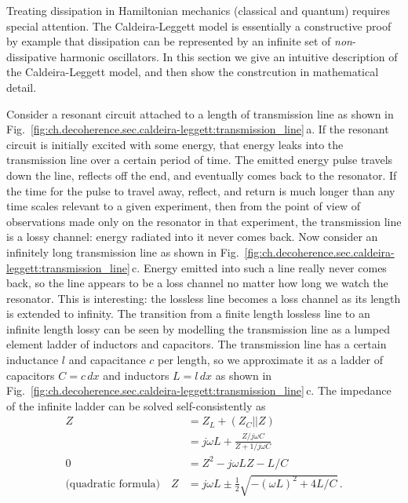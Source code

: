  \label{sec:ch.decoherence:caldeira-leggett}


Treating dissipation in Hamiltonian mechanics (classical and quantum) requires special attention.
The Caldeira-Leggett model is essentially a constructive proof by example that dissipation can be represented by an infinite set of \emph{non}-dissipative harmonic oscillators.
In this section we give an intuitive description of the Caldeira-Leggett model, and then show the constrcution in mathematical detail.


Consider a resonant circuit attached to a length of transmission line as shown in Fig.~\ref{fig:ch.decoherence.sec.caldeira-leggett:transmission_line}\,a.
If the resonant circuit is initially excited with some energy, that energy leaks into the transmission line over a certain period of time.
The emitted energy pulse travels down the line, reflects off the end, and eventually comes back to the resonator.
If the time for the pulse to travel away, reflect, and return is much longer than any time scales relevant to a given experiment, then from the point of view of observations made only on the resonator in that experiment, the transmission line is a lossy channel: energy radiated into it never comes back.
Now consider an infinitely long transmission line as shown in Fig.~\ref{fig:ch.decoherence.sec.caldeira-leggett:transmission_line}\,c.
Energy emitted into such a line really never comes back, so the line appears to be a loss channel no matter how long we watch the resonator.
This is interesting: the lossless line becomes a loss channel as its length is extended to infinity.
The transition from a finite length lossless line to an infinite length lossy can be seen by modelling the transmission line as a lumped element ladder of inductors and capacitors.
The transmission line has a certain inductance $\mathit{l}$ and capacitance $\mathit{c}$ per length, so we approximate it as a ladder of capacitors $C = \mathit{c} \, dx$ and inductors $L = \mathit{l} \, dx$ as shown in Fig.~\ref{fig:ch.decoherence.sec.caldeira-leggett:transmission_line}\,c.
The impedance of the infinite ladder can be solved self-consistently as
\begin{align}
  Z
  &= Z_L + \left( Z_C || Z \right) \nonumber \\
  &= j \omega L + \frac{Z / j \omega C}{Z + 1/ j \omega C} \nonumber \\
  0 &= Z^2 - j \omega L Z - L / C \nonumber \\
  \text{(quadratic formula)} \quad Z &= j \omega L \pm \frac{1}{2} \sqrt{-(\omega L)^2 + 4 L / C}
  \, .
\end{align}
